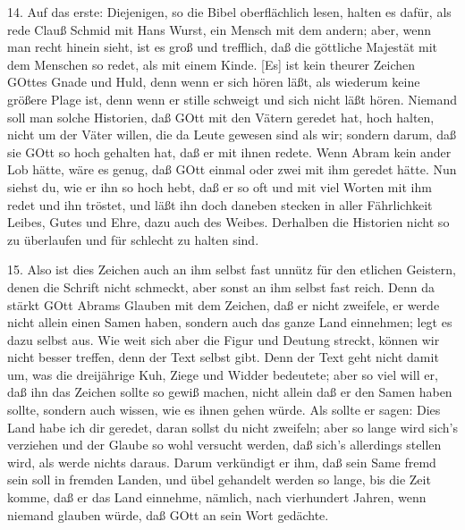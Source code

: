 14. Auf das erste: Diejenigen, so die Bibel oberflächlich lesen, halten es dafür, als rede Clauß Schmid mit Hans Wurst, ein Mensch mit dem andern; aber, wenn man recht hinein sieht, ist es groß und trefflich, daß die göttliche Majestät mit dem Menschen so redet, als mit einem Kinde. [Es] ist kein theurer Zeichen GOttes Gnade und Huld, denn wenn er sich hören läßt, als wiederum keine größere Plage ist, denn wenn er stille schweigt und sich nicht läßt hören. Niemand soll man solche Historien, daß GOtt mit den Vätern geredet hat, hoch halten, nicht um der Väter willen, die da Leute gewesen sind als wir; sondern darum, daß sie GOtt so hoch gehalten hat, daß er mit ihnen redete. Wenn Abram kein ander Lob hätte, wäre es genug, daß GOtt einmal oder zwei mit ihm geredet hätte. Nun siehst du, wie er ihn so hoch hebt, daß er so oft und mit viel Worten mit ihm redet und ihn tröstet, und läßt ihn doch daneben stecken in aller Fährlichkeit Leibes, Gutes und Ehre, dazu auch des Weibes. Derhalben die Historien nicht so zu überlaufen und für schlecht zu halten sind.

15. Also ist dies Zeichen auch an ihm selbst fast unnütz für den etlichen Geistern, denen die Schrift nicht schmeckt, aber sonst an ihm selbst fast reich. Denn da stärkt GOtt Abrams Glauben mit dem Zeichen, daß er nicht zweifele, er werde nicht allein einen Samen haben, sondern auch das ganze Land einnehmen; legt es dazu selbst aus. Wie weit sich aber die Figur und Deutung streckt, können wir nicht besser treffen, denn der Text
selbst gibt. Denn der Text geht nicht damit um, was die dreijährige Kuh, Ziege und Widder bedeutete; aber so viel will er, daß ihn das Zeichen sollte so gewiß machen, nicht allein daß er den Samen haben sollte, sondern auch wissen, wie es ihnen gehen würde. Als sollte er sagen: Dies Land habe ich dir geredet, daran sollst du nicht zweifeln; aber so lange wird sich’s verziehen und der Glaube so wohl versucht werden, daß sich’s allerdings stellen wird, als werde nichts daraus. Darum verkündigt er ihm, daß sein Same fremd sein soll in fremden Landen, und übel gehandelt werden so lange, bis die Zeit komme, daß er das Land einnehme, nämlich, nach vierhundert Jahren, wenn niemand glauben würde, daß GOtt an sein Wort gedächte.

